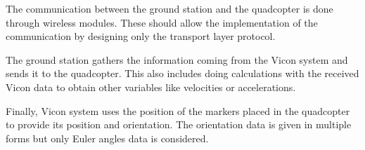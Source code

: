 The communication between the ground station and the quadcopter is done through wireless modules. These should allow the implementation of the communication by designing only the transport layer protocol.

The ground station gathers the information coming from the Vicon system and sends it to the quadcopter. This also includes doing calculations with the received Vicon data to obtain other variables like velocities or accelerations.

Finally, Vicon system uses the position of the markers placed in the quadcopter to provide its position and orientation. The orientation data is given in multiple forms but only Euler angles data is considered.

